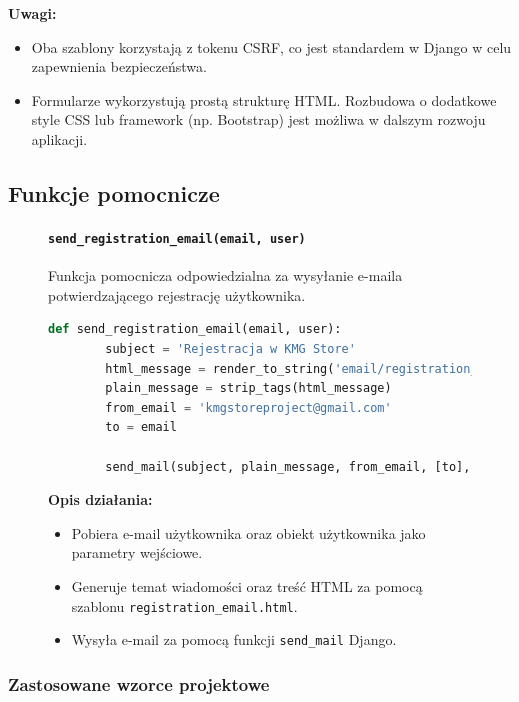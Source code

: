 \documentclass[12pt,a4paper,oneside]{article}
\theoremstyle{definition}
\numberwithin{equation}{section}
\begin{document}
\textbf{Uwagi:}
\begin{itemize}
    \item Oba szablony korzystają z tokenu CSRF, co jest standardem w Django w celu zapewnienia bezpieczeństwa.
    \item Formularze wykorzystują prostą strukturę HTML. Rozbudowa o dodatkowe style CSS lub framework (np. Bootstrap) jest możliwa w dalszym rozwoju aplikacji.
\end{itemize}

\subsection{Funkcje pomocnicze}
\label{sec:helper_functions}

\begin{figure}[H] %
    \paragraph{\texttt{send\_registration\_email(email, user)}}
    Funkcja pomocnicza odpowiedzialna za wysyłanie e-maila potwierdzającego rejestrację użytkownika.
    \begin{lstlisting}[language=Python, caption=Funkcja send_registration_email]
    def send_registration_email(email, user):
        subject = 'Rejestracja w KMG Store'
        html_message = render_to_string('email/registration_email.html', {'user': user})
        plain_message = strip_tags(html_message)
        from_email = 'kmgstoreproject@gmail.com'
        to = email

        send_mail(subject, plain_message, from_email, [to], html_message=html_message)
    \end{lstlisting}

    \textbf{Opis działania:}
    \begin{itemize}
        \item Pobiera e-mail użytkownika oraz obiekt użytkownika jako parametry wejściowe.
        \item Generuje temat wiadomości oraz treść HTML za pomocą szablonu \texttt{registration\_email.html}.
        \item Wysyła e-mail za pomocą funkcji \texttt{send\_mail} Django.
    \end{itemize}
\end{figure}


\subsubsection*{Zastosowane wzorce projektowe}
\end{document}
